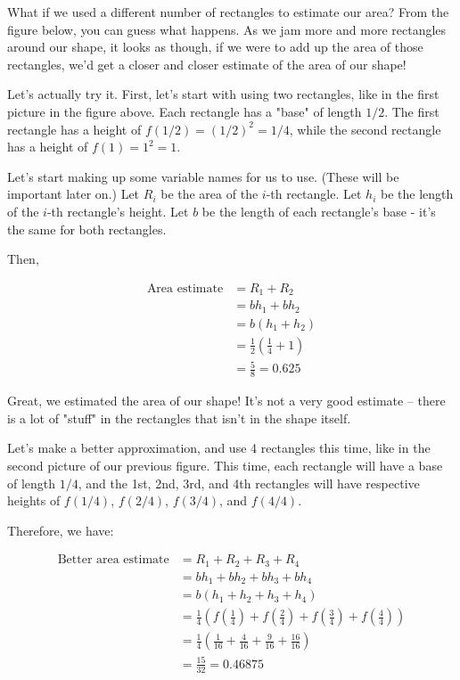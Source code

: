 \documentclass{book}
\begin{document}


What if we used a different number of rectangles to estimate our area? From the figure below, you can guess what happens. As we jam more and more rectangles around our shape, it looks as though, if we were to add up the area of those rectangles, we'd get a closer and closer estimate of the area of our shape!


Let's actually try it. First, let's start with using two rectangles, like in the first picture in the figure above. Each rectangle has a "base" of length $1/2$. The first rectangle has a height of $f(1/2) = (1/2)^2 = 1/4$, while the second rectangle has a height of $f(1) = 1^2 = 1$. 

Let's start making up some variable names for us to use. (These will be important later on.) Let $R_{i}$ be the area of the $i$-th rectangle. Let $h_{i}$ be the length of the $i$-th rectangle's height. Let $b$ be the length of each rectangle's base - it's the same for both rectangles.

Then,  

\begin{align*}
\text{Area estimate} &= R_1 + R_2 \\
&= b h_1 + b h_2 \\
&= b (h_1 + h_2) \\
&= \frac{1}{2} \left( \frac{1}{4} + 1 \right) \\
&= \frac{5}{8} = 0.625
\end{align*}

Great, we estimated the area of our shape! It's not a very good estimate -- there is a lot of "stuff" in the rectangles that isn't in the shape itself.

Let's make a better approximation, and use 4 rectangles this time, like in the second picture of our previous figure. This time, each rectangle will have a base of length $1/4$, and the 1st, 2nd, 3rd, and 4th rectangles will have respective heights of $f(1/4)$, $f(2/4)$, $f(3/4)$, and $f(4/4)$. 


Therefore, we have:  

\begin{align*}
\text{Better area estimate} &= R_1 + R_2 + R_3 + R_4 \\
&= b h_1 + b h_2 + b h_3 + b h_4 \\
&= b (h_1 + h_2 + h_3 + h_4) \\
&= \frac{1}{4} \left( f(\frac{1}{4}) + f(\frac{2}{4}) + f(\frac{3}{4}) + f(\frac{4}{4}) \right) \\
&= \frac{1}{4} \left( \frac{1}{16} + \frac{4}{16} + \frac{9}{16} + \frac{16}{16} \right) \\
&= \frac{15}{32} = 0.46875
\end{align*}
\end{document}
